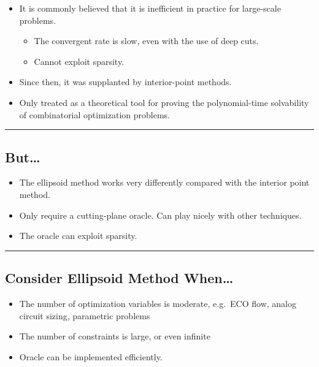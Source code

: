 \documentclass[]{article}
\begin{document}
\begin{itemize}
\item
  It is commonly believed that it is inefficient in practice for
  large-scale problems.

  \begin{itemize}
  \item
    The convergent rate is slow, even with the use of deep cuts.
  \item
    Cannot exploit sparsity.
  \end{itemize}
\item
  Since then, it was supplanted by interior-point methods.
\item
  Only treated as a theoretical tool for proving the polynomial-time
  solvability of combinatorial optimization problems.
\end{itemize}

\begin{center}\rule{0.5\linewidth}{\linethickness}\end{center}

\hypertarget{but}{%
\subsection{But\ldots{}}\label{but}}

\begin{itemize}
\item
  The ellipsoid method works very differently compared with the interior
  point method.
\item
  Only require a cutting-plane oracle. Can play nicely with other
  techniques.
\item
  The oracle can exploit sparsity.
\end{itemize}

\begin{center}\rule{0.5\linewidth}{\linethickness}\end{center}

\hypertarget{consider-ellipsoid-method-when}{%
\subsection{Consider Ellipsoid Method
When\ldots{}}\label{consider-ellipsoid-method-when}}

\begin{itemize}
\item
  The number of optimization variables is moderate, e.g.~ECO flow,
  analog circuit sizing, parametric problems
\item
  The number of constraints is large, or even infinite
\item
  Oracle can be implemented efficiently.
\end{itemize}
\end{document}
